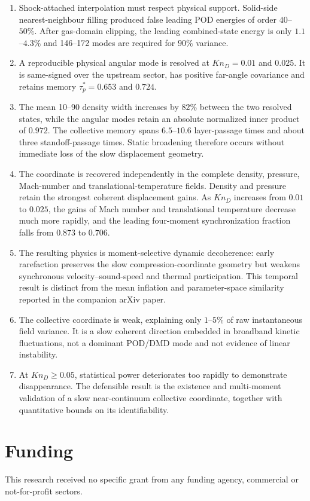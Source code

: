 \documentclass[paper]{JFM-FLM_Au}
\newcommand{\KnD}{Kn_D}
\begin{document}
\begin{enumerate}[leftmargin=1.6em]
\item Shock-attached interpolation must respect physical support. Solid-side nearest-neighbour filling produced false leading POD energies of order $40$--$50\%$. After gas-domain clipping, the leading combined-state energy is only $1.1$--$4.3\%$ and 146--172 modes are required for $90\%$ variance.
\item A reproducible physical angular mode is resolved at $\KnD=0.01$ and $0.025$. It is same-signed over the upstream sector, has positive far-angle covariance and retains memory $\tau_p^*=0.653$ and $0.724$.
\item The mean 10--90 density width increases by $82\%$ between the two resolved states, while the angular modes retain an absolute normalized inner product of $0.972$. The collective memory spans $6.5$--$10.6$ layer-passage times and about three standoff-passage times. Static broadening therefore occurs without immediate loss of the slow displacement geometry.
\item The coordinate is recovered independently in the complete density, pressure, Mach-number and translational-temperature fields. Density and pressure retain the strongest coherent displacement gains. As $\KnD$ increases from $0.01$ to $0.025$, the gains of Mach number and translational temperature decrease much more rapidly, and the leading four-moment synchronization fraction falls from $0.873$ to $0.706$.
\item The resulting physics is moment-selective dynamic decoherence: early rarefaction preserves the slow compression-coordinate geometry but weakens synchronous velocity--sound-speed and thermal participation. This temporal result is distinct from the mean inflation and parameter-space similarity reported in the companion arXiv paper.
\item The collective coordinate is weak, explaining only $1$--$5\%$ of raw instantaneous field variance. It is a slow coherent direction embedded in broadband kinetic fluctuations, not a dominant POD/DMD mode and not evidence of linear instability.
\item At $\KnD\geq0.05$, statistical power deteriorates too rapidly to demonstrate disappearance. The defensible result is the existence and multi-moment validation of a slow near-continuum collective coordinate, together with quantitative bounds on its identifiability.
\end{enumerate}

\section*{Funding}
This research received no specific grant from any funding agency, commercial or not-for-profit sectors.
\end{document}
